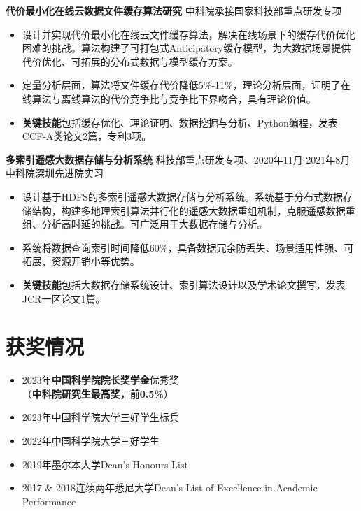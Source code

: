 \documentclass[UTF8,letterpaper,10.9pt]{article}
\begin{document}
\vspace{1pt}

\textbf{代价最小化在线云数据文件缓存算法研究} \hfill 中科院承接国家科技部重点研发专项

\begin{itemize}
  \setlength\itemsep{1.8pt}
  \item 设计并实现代价最小化在线云文件缓存算法，解决在线场景下的缓存代价优化困难的挑战。算法构建了可打包式Anticipatory缓存模型，为大数据场景提供代价优化、可拓展的分布式数据与模型缓存方案。
  \item 定量分析层面，算法将文件缓存代价降低5\%-11\%，理论分析层面，证明了在线算法与离线算法的代价竞争比与竞争比下界吻合，具有理论价值。
  \item \textbf{关键技能}包括缓存优化、理论证明、数据挖掘与分析、Python编程，发表CCF-A类论文2篇，专利3项。
\end{itemize}

\vspace{1pt}

\textbf{多索引遥感大数据存储与分析系统} \hfill 科技部重点研发专项、2020年11月-2021年8月中科院深圳先进院实习

\begin{itemize}
  \setlength\itemsep{1.8pt}
  \item 设计基于HDFS的多索引遥感大数据存储与分析系统。系统基于分布式数据存储结构，构建多地理索引算法并行化的遥感大数据重组机制，克服遥感数据重组、分析高时延的挑战。可广泛用于大数据存储与分析。
  \item 系统将数据查询索引时间降低60\%，具备数据冗余防丢失、场景适用性强、可拓展、资源开销小等优势。
  \item \textbf{关键技能}包括大数据存储系统设计、索引算法设计以及学术论文撰写，发表JCR一区论文1篇。
\end{itemize}




\section{\textbf{获奖情况}}
\vspace{-5mm}
\begin{multicols}{2}
\begin{itemize}
  \setlength\itemsep{1.8pt}
  \item 2023年\textbf{中国科学院院长奖学金}优秀奖\\（\textbf{中科院研究生最高奖，前0.5\%}）
  \item 2023年中国科学院大学三好学生标兵
  \item 2022年中国科学院大学三好学生
  \item 2019年墨尔本大学Dean's Honours List
  \item 2017 \& 2018连续两年悉尼大学Dean's List of Excellence in Academic Performance
\end{itemize}
\end{multicols}
\end{document}
